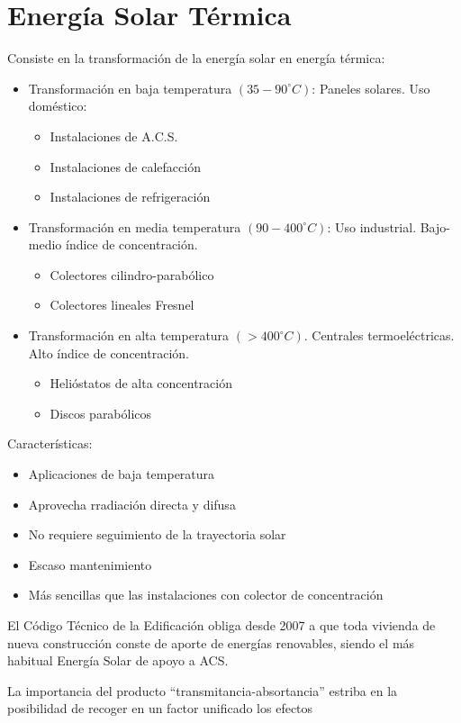 \section{Energía Solar Térmica}
Consiste en la transformación de la energía solar en energía térmica:
\begin{itemize}
    \item Transformación en baja temperatura $(35-90^\circ C)$: Paneles solares. Uso doméstico:
    \begin{itemize}
        \item Instalaciones de A.C.S.
        \item Instalaciones de calefacción
        \item Instalaciones de refrigeración
    \end{itemize}
    \item Transformación en media temperatura $(90-400^\circ C)$: Uso industrial. Bajo-medio índice de concentración.
    \begin{itemize}
        \item Colectores cilindro-parabólico
        \item Colectores lineales Fresnel
    \end{itemize}
    \item Transformación en alta temperatura $(>400^\circ C)$. Centrales termoeléctricas. Alto índice de concentración.
    \begin{itemize}
        \item Helióstatos de alta concentración
        \item Discos parabólicos
    \end{itemize}
\end{itemize}

Características:
\begin{itemize}
    \item Aplicaciones de baja temperatura
    \item Aprovecha rradiación directa y difusa
    \item No requiere seguimiento de la trayectoria solar
    \item Escaso mantenimiento
    \item Más sencillas que las instalaciones con colector de concentración
\end{itemize}

El Código Técnico de la Edificación obliga desde 2007 a que toda vivienda de nueva construcción conste de aporte de energías renovables, siendo el más habitual Energía Solar de apoyo a ACS.

La importancia del producto ``transmitancia-absortancia'' estriba en la posibilidad de recoger en un factor unificado los efectos